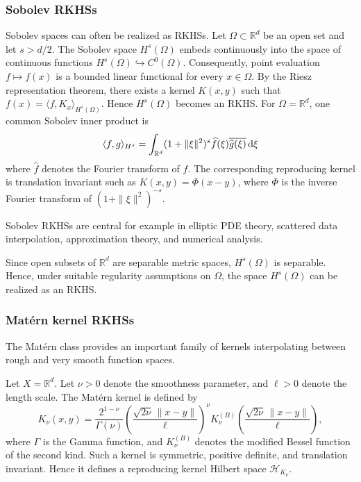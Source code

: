 \documentclass[12pt]{amsart}
\newcommand{\D}[1]{\mbox{\rm #1}}
\newcommand{\dd}{\D{d}}
\numberwithin{equation}{section}
\begin{document}
\subsubsection{Sobolev RKHSs}

Sobolev spaces can often be realized as RKHSs.  Let $\Omega\subset\mathbb{R}^d$ be an open set and let $s>d/2$. The Sobolev space $H^s(\Omega)$ embeds continuously into the space of continuous functions $H^s(\Omega)\hookrightarrow C^0(\Omega)$.  Consequently, point evaluation $f\mapsto f(x)$ is a bounded linear functional for every $x\in\Omega$. 
By the Riesz representation theorem, there exists a kernel $K(x,y)$ such that $f(x) = \langle f,K_x\rangle_{H^s(\Omega)}$. Hence $H^s(\Omega)$ becomes an RKHS. For $\Omega=\mathbb{R}^d$, one common Sobolev inner product is
\[
    \langle f,g\rangle_{H^s} =  \int_{\mathbb{R}^d} (1+\|\xi\|^2)^s \widehat{f}(\xi) \overline{\widehat{g}(\xi)} \,\dd\xi
\]
where $\widehat{f}$ denotes the Fourier transform of $f$. 
The corresponding reproducing kernel is translation invariant such as $K(x,y)=\Phi(x-y)$, where $\Phi$ is the inverse Fourier transform of $(1+\|\xi\|^2)^{-s}$. 

Sobolev RKHSs are central for example in elliptic PDE theory, scattered data interpolation, approximation theory, and numerical analysis. 

Since open subsets of $\mathbb{R}^d$ are separable metric spaces, $H^s(\Omega)$ is separable. 
Hence, under suitable regularity assumptions on $\Omega$, the space $H^s(\Omega)$ can be realized as an RKHS. 


\subsubsection{Mat\'ern kernel RKHSs}

The Mat\'ern class provides an important family of kernels interpolating between rough and very smooth function spaces.

Let $X=\mathbb{R}^d$. Let $\nu>0$ denote the smoothness parameter, and $\ell>0$ denote the length scale. 
The Mat\'ern kernel is defined by
\[
    K_\nu(x,y) = \frac{2^{1-\nu}}{\Gamma(\nu)} \left( \frac{\sqrt{2\nu}\,\|x-y\|}{\ell} \right)^\nu K_\nu^{(B)} \left( \frac{\sqrt{2\nu}\,\|x-y\|}{\ell} \right),
\]
where $\Gamma$ is the Gamma function, and  $K_\nu^{(B)}$ denotes the modified Bessel function of the second kind. Such a kernel is symmetric, positive definite, and  translation invariant. Hence it defines a reproducing kernel Hilbert space $\mathcal{H}_{K_\nu}$. 
\end{document}
